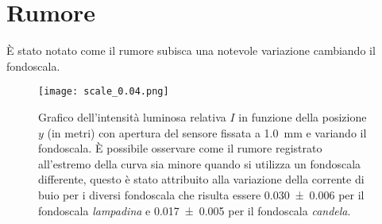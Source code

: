 \documentclass[../main.tex]{subfiles}
\begin{document}
\section{Rumore}

È stato notato come il rumore subisca una notevole variazione cambiando il fondoscala.

\begin{figure}[ht!]
    \centering
    \texttt{[image: scale\_0.04.png]}
    \caption{Grafico dell'intensità luminosa relativa $I$ in funzione della posizione $y$ (in metri) con apertura del sensore fissata a \qty{1.0}{\mm} e variando il fondoscala. È possibile osservare come il rumore registrato all'estremo della curva sia minore quando si utilizza un fondoscala differente, questo è stato attribuito alla variazione della corrente di buio per i diversi fondoscala che risulta essere \num{0.030+-0.006} per il fondoscala \textit{lampadina} e \num{0.017+-0.005} per il fondoscala \textit{candela}.} %
\end{figure}
\end{document}
